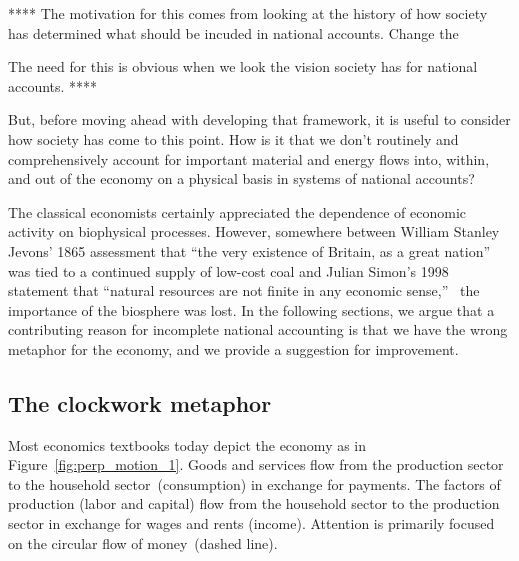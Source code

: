 **** The motivation for this comes from looking at the history
of how society has determined what should be incuded in national accounts. 
Change the 

The need for this is obvious when we look the vision society has for national accounts.
****

But, before moving ahead with developing that framework,
it is useful to consider how society has come to this point.
How is it that we don't routinely and comprehensively account for
important material and energy flows into, within, and out of the economy
on a physical basis in systems of national accounts?

The classical economists certainly appreciated the dependence of
economic activity on biophysical processes.\cite{Hall2011, Cleveland1987, Dale2012}
However, somewhere between William Stanley Jevons' 1865
assessment that
``the very existence of Britain, as a great nation''~\cite[IV.3]{Jevons1865}
was tied to a continued supply of low-cost coal 
and Julian Simon's 1998 statement that
``natural resources are not finite in any economic sense,''~\cite[p.~54]{Simon1998} %
the importance of the biosphere was lost.
In the following sections, we argue that
a contributing reason for incomplete national accounting
is that we have the wrong metaphor for the economy,
and we provide a suggestion for improvement.


\subsection{The clockwork metaphor}
\label{sec:clockwork_metaphor}

Most economics textbooks today depict the economy 
as in Figure~\ref{fig:perp_motion_1}.
Goods and services flow from the production sector
to the household sector~(consumption)
in exchange for payments.
The factors of production (labor and capital)
flow from the household sector to the
production sector in exchange for wages and rents (income).
Attention is primarily focused on the circular flow
of money~(dashed line).

